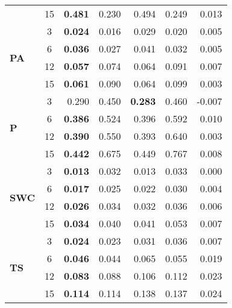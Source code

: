 \begin{table}
\begin{tabular}{p{2.1cm}c|rr|rr|r}
 & 15 & \bfseries 0.481 & 0.230 & 0.494 & 0.249 & 0.013 \\
\cline{1-7}
\multirow[c]{4}{*}{\parbox{2.1cm}{\textbf{PA}}} & 3 & \bfseries 0.024 & 0.016 & 0.029 & 0.020 & 0.005 \\
 & 6 & \bfseries 0.036 & 0.027 & 0.041 & 0.032 & 0.005 \\
 & 12 & \bfseries 0.057 & 0.074 & 0.064 & 0.091 & 0.007 \\
 & 15 & \bfseries 0.061 & 0.090 & 0.064 & 0.099 & 0.003 \\
\cline{1-7}
\multirow[c]{4}{*}{\parbox{2.1cm}{\textbf{P}}} & 3 & 0.290 & 0.450 & \bfseries 0.283 & 0.460 & -0.007 \\
 & 6 & \bfseries 0.386 & 0.524 & 0.396 & 0.592 & 0.010 \\
 & 12 & \bfseries 0.390 & 0.550 & 0.393 & 0.640 & 0.003 \\
 & 15 & \bfseries 0.442 & 0.675 & 0.449 & 0.767 & 0.008 \\
\cline{1-7}
\multirow[c]{4}{*}{\parbox{2.1cm}{\textbf{SWC}}} & 3 & \bfseries 0.013 & 0.032 & 0.013 & 0.033 & 0.000 \\
 & 6 & \bfseries 0.017 & 0.025 & 0.022 & 0.030 & 0.004 \\
 & 12 & \bfseries 0.026 & 0.034 & 0.032 & 0.036 & 0.006 \\
 & 15 & \bfseries 0.034 & 0.040 & 0.041 & 0.053 & 0.007 \\
\cline{1-7}
\multirow[c]{4}{*}{\parbox{2.1cm}{\textbf{TS}}} & 3 & \bfseries 0.024 & 0.023 & 0.031 & 0.036 & 0.007 \\
 & 6 & \bfseries 0.046 & 0.044 & 0.065 & 0.055 & 0.019 \\
 & 12 & \bfseries 0.083 & 0.088 & 0.106 & 0.112 & 0.023 \\
 & 15 & \bfseries 0.114 & 0.114 & 0.138 & 0.137 & 0.024 \\
\cline{1-7}
\bottomrule
\end{tabular}
\end{table}
